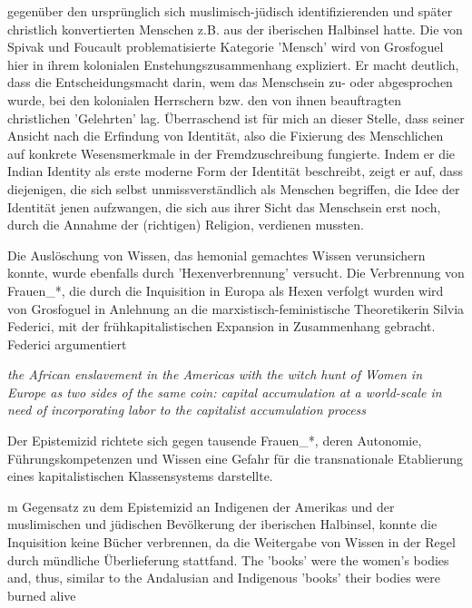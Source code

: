 gegenüber den ursprünglich sich muslimisch-jüdisch identifizierenden und später
christlich konvertierten Menschen z.B. aus der iberischen Halbinsel
hatte.\footnotemark {} Die von Spivak und Foucault
problematisierte Kategorie 'Mensch' wird von Grosfoguel hier in ihrem
kolonialen Enstehungszusammenhang expliziert. Er macht deutlich, dass die
Entscheidungsmacht darin, wem das Menschsein zu- oder abgesprochen wurde, bei
den kolonialen Herrschern bzw. den von ihnen beauftragten christlichen
'Gelehrten' lag. Überraschend ist für mich an dieser Stelle, dass seiner
Ansicht nach die Erfindung von Identität, also die Fixierung des Menschlichen
auf konkrete Wesensmerkmale in der Fremdzuschreibung fungierte. Indem er die
\glqq Indian Identity \grqq als erste moderne Form der Identität beschreibt, zeigt er
auf, dass diejenigen, die sich selbst unmissverständlich als Menschen
begriffen, die Idee der Identität jenen aufzwangen, die sich aus ihrer Sicht
das Menschsein erst noch, durch die Annahme der (richtigen) Religion, verdienen
mussten. 

Die Auslöschung von Wissen, das hemonial gemachtes Wissen verunsichern konnte,
wurde ebenfalls durch 'Hexenverbrennung'  versucht. Die Verbrennung von
Frauen\_*, die durch die Inquisition in Europa als Hexen verfolgt wurden wird
von Grosfoguel in Anlehnung an die marxistisch-feministische Theoretikerin
Silvia Federici, mit der frühkapitalistischen Expansion in Zusammenhang
gebracht. Federici argumentiert
\begin{myenv}
  \textit{\glqq the African enslavement in the Americas with the witch hunt of
    Women in Europe as two sides of the same coin: capital accumulation at a
    world-scale in need of incorporating labor to the capitalist accumulation
  process  \grqq \footnotemark {} }
\end{myenv}

Der Epistemizid richtete sich gegen tausende Frauen\_*, deren \glqq Autonomie,
Führungskompetenzen und Wissen \grqq \footnotemark {} 
eine Gefahr für die transnationale Etablierung
eines kapitalistischen Klassensystems darstellte.

m Gegensatz zu dem Epistemizid an Indigenen der Amerikas und der muslimischen
und jüdischen Bevölkerung der iberischen Halbinsel, konnte die Inquisition
keine Bücher verbrennen, da die Weitergabe von Wissen in der Regel durch
mündliche Überlieferung stattfand. \glqq The 'books' were the women’s bodies and,
thus, similar to the Andalusian and Indigenous 'books' their bodies were burned
alive \grqq \footnotemark {}

